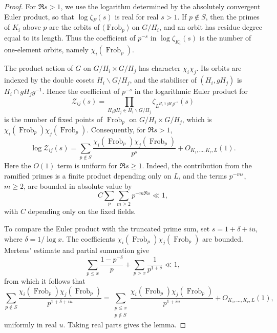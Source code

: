 \documentclass[twoside,reqno,11pt,a4paper]{amsart}
\numberwithin{equation}{section}
\theoremstyle{plain}
\theoremstyle{definition}
\theoremstyle{remark}
\DeclareMathOperator{\Frob}{Frob}
\newcommand{\calZ}{\mathcal Z}
\renewcommand{\le}{\leqslant}
\renewcommand{\ge}{\geqslant}
\begin{document}
\begin{proof}
For $\Re s>1$, we use the logarithm determined by the absolutely convergent Euler product, so that $\log\zeta_F(s)$ is real for real $s>1$.  If $p\notin S$, then the primes of $K_i$ above $p$ are the orbits of $\langle\Frob_p\rangle$ on $G/H_i$, and an orbit has residue degree equal to its length.  Thus the coefficient of $p^{-s}$ in $\log\zeta_{K_i}(s)$ is the number of one-element orbits, namely $\chi_i(\Frob_p)$.

The product action of $G$ on $G/H_i\times G/H_j$ has character $\chi_i\chi_j$.  Its orbits are indexed by the double cosets $H_i\backslash G/H_j$, and the stabiliser of $(H_i,gH_j)$ is $H_i\cap gH_jg^{-1}$.  Hence the coefficient of $p^{-s}$ in the logarithmic Euler product for
\begin{equation*}
        \calZ_{ij}(s)=
        \prod_{H_i gH_j\in H_i\backslash G/H_j}
        \zeta_{L^{H_i\cap gH_jg^{-1}}}(s)
\end{equation*}
is the number of fixed points of $\Frob_p$ on $G/H_i\times G/H_j$, which is $\chi_i(\Frob_p)\chi_j(\Frob_p)$. Consequently, for $\Re s>1$,
\begin{equation*}
        \log\calZ_{ij}(s)
        =
        \sum_{p\notin S}\frac{\chi_i(\Frob_p)\chi_j(\Frob_p)}{p^s}
        +O_{K_1,\ldots,K_r,L}(1).
\end{equation*}
Here the $O(1)$ term is uniform for $\Re s\ge1$.  Indeed, the contribution from the ramified primes is a finite product depending only on $L$, and the terms $p^{-ms}$, $m\ge2$, are bounded in absolute value by
\begin{equation*}
        C\sum_p\sum_{m\ge2}p^{-m\Re s}\ll 1,
\end{equation*}
with $C$ depending only on the fixed fields.

To compare the Euler product with the truncated prime sum, set $s=1+\delta+iu$, where $\delta=1/\log x$.  The coefficients $\chi_i(\Frob_p)\chi_j(\Frob_p)$ are bounded.  Mertens' estimate and partial summation give
\begin{equation*}
        \sum_{p\le  x}\frac{1-p^{-\delta}}p+
        \sum_{p>x}\frac1{p^{1+\delta}}
        \ll 1,
\end{equation*}
from which it follows that
\begin{equation*}
        \sum_{p\notin S}\frac{\chi_i(\Frob_p)\chi_j(\Frob_p)}{p^{1+\delta+iu}}
        =
        \sum_{\substack{p\le x\\p\notin S}}
        \frac{\chi_i(\Frob_p)\chi_j(\Frob_p)}{p^{1+iu}}
        +O_{K_1,\ldots,K_r,L}(1),
\end{equation*}
uniformly in real $u$.  Taking real parts gives the lemma.
\end{proof}
\end{document}
